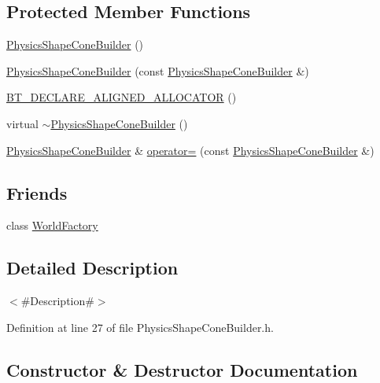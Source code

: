 \subsection*{Protected Member Functions}
\begin{DoxyCompactItemize}
\item 
\mbox{\hyperlink{classnjli_1_1_physics_shape_cone_builder_a4bc0201417bffd77b88719ee19f20327}{Physics\+Shape\+Cone\+Builder}} ()
\item 
\mbox{\hyperlink{classnjli_1_1_physics_shape_cone_builder_a6287d989772e35f6970a09f5675cd11d}{Physics\+Shape\+Cone\+Builder}} (const \mbox{\hyperlink{classnjli_1_1_physics_shape_cone_builder}{Physics\+Shape\+Cone\+Builder}} \&)
\item 
\mbox{\hyperlink{classnjli_1_1_physics_shape_cone_builder_ae94f4900d22701a09a607fea8af8747d}{B\+T\+\_\+\+D\+E\+C\+L\+A\+R\+E\+\_\+\+A\+L\+I\+G\+N\+E\+D\+\_\+\+A\+L\+L\+O\+C\+A\+T\+OR}} ()
\item 
virtual \mbox{\hyperlink{classnjli_1_1_physics_shape_cone_builder_a8f20a57dc48b9f3f1a6fd1375199abf6}{$\sim$\+Physics\+Shape\+Cone\+Builder}} ()
\item 
\mbox{\hyperlink{classnjli_1_1_physics_shape_cone_builder}{Physics\+Shape\+Cone\+Builder}} \& \mbox{\hyperlink{classnjli_1_1_physics_shape_cone_builder_a72b982131c1f57bb408cf650fb7fd637}{operator=}} (const \mbox{\hyperlink{classnjli_1_1_physics_shape_cone_builder}{Physics\+Shape\+Cone\+Builder}} \&)
\end{DoxyCompactItemize}
\subsection*{Friends}
\begin{DoxyCompactItemize}
\item 
class \mbox{\hyperlink{classnjli_1_1_physics_shape_cone_builder_acb96ebb09abe8f2a37a915a842babfac}{World\+Factory}}
\end{DoxyCompactItemize}


\subsection{Detailed Description}
$<$\#\+Description\#$>$ 

Definition at line 27 of file Physics\+Shape\+Cone\+Builder.\+h.



\subsection{Constructor \& Destructor Documentation}
\mbox{\label{classnjli_1_1_physics_shape_cone_builder_a4bc0201417bffd77b88719ee19f20327}} 
